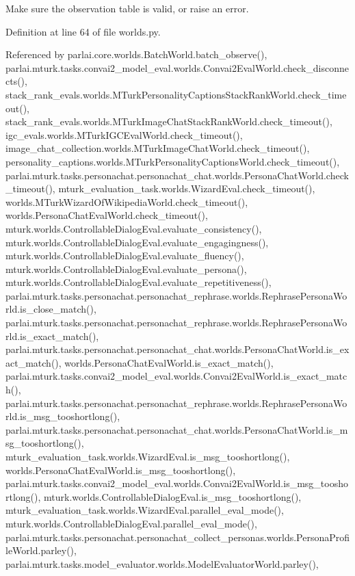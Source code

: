 \begin{DoxyVerb}Make sure the observation table is valid, or raise an error.\end{DoxyVerb}
 

Definition at line 64 of file worlds.\+py.



Referenced by parlai.\+core.\+worlds.\+Batch\+World.\+batch\+\_\+observe(), parlai.\+mturk.\+tasks.\+convai2\+\_\+model\+\_\+eval.\+worlds.\+Convai2\+Eval\+World.\+check\+\_\+disconnects(), stack\+\_\+rank\+\_\+evals.\+worlds.\+M\+Turk\+Personality\+Captions\+Stack\+Rank\+World.\+check\+\_\+timeout(), stack\+\_\+rank\+\_\+evals.\+worlds.\+M\+Turk\+Image\+Chat\+Stack\+Rank\+World.\+check\+\_\+timeout(), igc\+\_\+evals.\+worlds.\+M\+Turk\+I\+G\+C\+Eval\+World.\+check\+\_\+timeout(), image\+\_\+chat\+\_\+collection.\+worlds.\+M\+Turk\+Image\+Chat\+World.\+check\+\_\+timeout(), personality\+\_\+captions.\+worlds.\+M\+Turk\+Personality\+Captions\+World.\+check\+\_\+timeout(), parlai.\+mturk.\+tasks.\+personachat.\+personachat\+\_\+chat.\+worlds.\+Persona\+Chat\+World.\+check\+\_\+timeout(), mturk\+\_\+evaluation\+\_\+task.\+worlds.\+Wizard\+Eval.\+check\+\_\+timeout(), worlds.\+M\+Turk\+Wizard\+Of\+Wikipedia\+World.\+check\+\_\+timeout(), worlds.\+Persona\+Chat\+Eval\+World.\+check\+\_\+timeout(), mturk.\+worlds.\+Controllable\+Dialog\+Eval.\+evaluate\+\_\+consistency(), mturk.\+worlds.\+Controllable\+Dialog\+Eval.\+evaluate\+\_\+engagingness(), mturk.\+worlds.\+Controllable\+Dialog\+Eval.\+evaluate\+\_\+fluency(), mturk.\+worlds.\+Controllable\+Dialog\+Eval.\+evaluate\+\_\+persona(), mturk.\+worlds.\+Controllable\+Dialog\+Eval.\+evaluate\+\_\+repetitiveness(), parlai.\+mturk.\+tasks.\+personachat.\+personachat\+\_\+rephrase.\+worlds.\+Rephrase\+Persona\+World.\+is\+\_\+close\+\_\+match(), parlai.\+mturk.\+tasks.\+personachat.\+personachat\+\_\+rephrase.\+worlds.\+Rephrase\+Persona\+World.\+is\+\_\+exact\+\_\+match(), parlai.\+mturk.\+tasks.\+personachat.\+personachat\+\_\+chat.\+worlds.\+Persona\+Chat\+World.\+is\+\_\+exact\+\_\+match(), worlds.\+Persona\+Chat\+Eval\+World.\+is\+\_\+exact\+\_\+match(), parlai.\+mturk.\+tasks.\+convai2\+\_\+model\+\_\+eval.\+worlds.\+Convai2\+Eval\+World.\+is\+\_\+exact\+\_\+match(), parlai.\+mturk.\+tasks.\+personachat.\+personachat\+\_\+rephrase.\+worlds.\+Rephrase\+Persona\+World.\+is\+\_\+msg\+\_\+tooshortlong(), parlai.\+mturk.\+tasks.\+personachat.\+personachat\+\_\+chat.\+worlds.\+Persona\+Chat\+World.\+is\+\_\+msg\+\_\+tooshortlong(), mturk\+\_\+evaluation\+\_\+task.\+worlds.\+Wizard\+Eval.\+is\+\_\+msg\+\_\+tooshortlong(), worlds.\+Persona\+Chat\+Eval\+World.\+is\+\_\+msg\+\_\+tooshortlong(), parlai.\+mturk.\+tasks.\+convai2\+\_\+model\+\_\+eval.\+worlds.\+Convai2\+Eval\+World.\+is\+\_\+msg\+\_\+tooshortlong(), mturk.\+worlds.\+Controllable\+Dialog\+Eval.\+is\+\_\+msg\+\_\+tooshortlong(), mturk\+\_\+evaluation\+\_\+task.\+worlds.\+Wizard\+Eval.\+parallel\+\_\+eval\+\_\+mode(), mturk.\+worlds.\+Controllable\+Dialog\+Eval.\+parallel\+\_\+eval\+\_\+mode(), parlai.\+mturk.\+tasks.\+personachat.\+personachat\+\_\+collect\+\_\+personas.\+worlds.\+Persona\+Profile\+World.\+parley(), parlai.\+mturk.\+tasks.\+model\+\_\+evaluator.\+worlds.\+Model\+Evaluator\+World.\+parley(), 